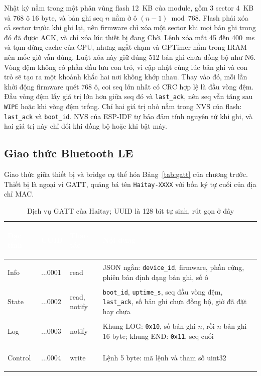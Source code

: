 Nhật ký nằm trong một phân vùng flash 12~KB của module, gồm 3 sector 4~KB và 768 ô 16 byte, và bản ghi seq $n$ nằm ở ô $(n-1) \bmod 768$. Flash phải xóa cả sector trước khi ghi lại, nên firmware chỉ xóa một sector khi mọi bản ghi trong đó đã được ACK, và chỉ xóa lúc thiết bị đang Chờ. Lệnh xóa mất 45 đến 400~ms và tạm dừng cache của CPU, nhưng ngắt chạm và GPTimer nằm trong IRAM nên mốc giờ vẫn đúng. Luật xóa này giữ đúng 512 bản ghi chưa đồng bộ như N6. Vòng đệm không có phần đầu lưu con trỏ, vì cập nhật cùng lúc bản ghi và con trỏ sẽ tạo ra một khoảnh khắc hai nơi không khớp nhau. Thay vào đó, mỗi lần khởi động firmware quét 768 ô, coi seq lớn nhất có CRC hợp lệ là đầu vòng đệm. Đầu vòng đệm lấy giá trị lớn hơn giữa seq đó và \texttt{last\_ack}, nên seq vẫn tăng sau \texttt{WIPE} hoặc khi vòng đệm trống. Chỉ hai giá trị nhỏ nằm trong NVS của flash: \texttt{last\_ack} và \texttt{boot\_id}. NVS của ESP-IDF tự bảo đảm tính nguyên tử khi ghi, và hai giá trị này chỉ đổi khi đồng bộ hoặc khi bật máy.

\subsection{Giao thức Bluetooth LE}
\label{sec:gatt}
Giao thức giữa thiết bị và bridge cụ thể hóa Bảng~\ref{tab:gatt} của chương trước. Thiết bị là ngoại vi GATT, quảng bá tên \texttt{Haitay-XXXX} với bốn ký tự cuối của địa chỉ MAC.

\begin{table}[H]
    \centering
    \small
    \renewcommand{\arraystretch}{1.35}
    \caption{Dịch vụ GATT của Haitay; UUID là 128 bit tự sinh, rút gọn ở đây}
    \label{tab:gatt-detail}
    \begin{tabular}{>{\bfseries\raggedright\arraybackslash}m{1.9cm} >{\ttfamily\raggedright\arraybackslash}m{1.9cm} >{\raggedright\arraybackslash}m{2.1cm} >{\raggedright\arraybackslash}m{7.8cm}}
        \toprule
        \rowcolor{haitayblue}
        \textcolor{white}{Đặc tính} & \textcolor{white}{UUID} & \textcolor{white}{Thao tác} & \textcolor{white}{Nội dung} \\
        \midrule
        \rowcolor{haitayblue!8}
        Info & ...0001 & read & JSON ngắn: \texttt{device\_id}, firmware, phần cứng, phiên bản định dạng bản ghi, số ô \\
        State & ...0002 & read, notify & \texttt{boot\_id}, \texttt{uptime\_s}, seq đầu vòng đệm, \texttt{last\_ack}, số bản ghi chưa đồng bộ, giờ đã đặt hay chưa \\
        \rowcolor{haitayblue!8}
        Log & ...0003 & notify & Khung LOG: \texttt{0x10}, số bản ghi $n$, rồi $n$ bản ghi 16 byte; khung END: \texttt{0x11}, seq cuối \\
        Control & ...0004 & write & Lệnh 5 byte: mã lệnh và tham số uint32 \\
        \bottomrule
    \end{tabular}
\end{table}

